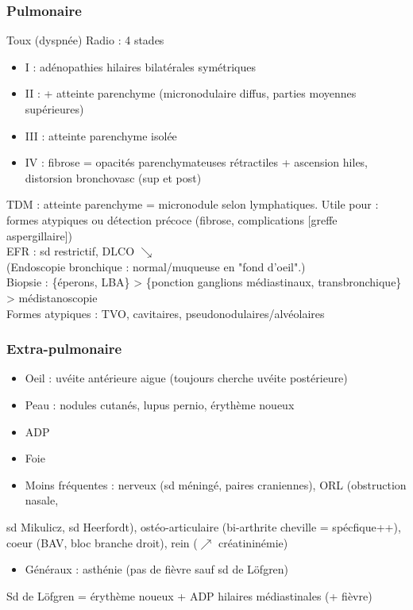 \documentclass{article}
\begin{document}
\subsubsection{Pulmonaire}
\label{sec:org4ec1d7e}
Toux (dyspnée)
Radio : 4 stades
\begin{itemize}
\item I : adénopathies hilaires bilatérales symétriques
\item II : + atteinte parenchyme (micronodulaire diffus, parties moyennes supérieures)
\item III : atteinte parenchyme isolée
\item IV : fibrose = opacités parenchymateuses rétractiles + ascension hiles, distorsion bronchovasc (sup et post)
\end{itemize}
TDM : atteinte parenchyme = micronodule selon lymphatiques. Utile pour : formes atypiques ou détection précoce (fibrose, complications [greffe aspergillaire])\\
EFR : sd restrictif, DLCO $\searrow$\\
(Endoscopie bronchique : normal/muqueuse en "fond d'oeil".)\\
Biopsie : \{éperons, LBA\} > \{ponction ganglions médiastinaux, transbronchique\} > médistanoscopie\\
Formes atypiques : TVO, cavitaires, pseudonodulaires/alvéolaires

\subsubsection{Extra-pulmonaire}
\label{sec:org316c190}
\begin{itemize}
\item Oeil : uvéite antérieure aigue (toujours cherche uvéite postérieure)
\item Peau : nodules cutanés, lupus pernio, érythème noueux
\item ADP
\item Foie
\item Moins fréquentes : nerveux (sd méningé, paires craniennes), ORL (obstruction
  nasale,
\end{itemize}
sd Mikulicz, sd Heerfordt), ostéo-articulaire (bi-arthrite cheville =
spécfique++), 
coeur (BAV, bloc branche droit), rein (\(\nearrow\) créatininémie)
\begin{itemize}
\item Généraux : asthénie (pas de fièvre sauf sd de Löfgren)
\end{itemize}
Sd de Löfgren = érythème noueux + ADP hilaires médiastinales (+ fièvre)
\end{document}
